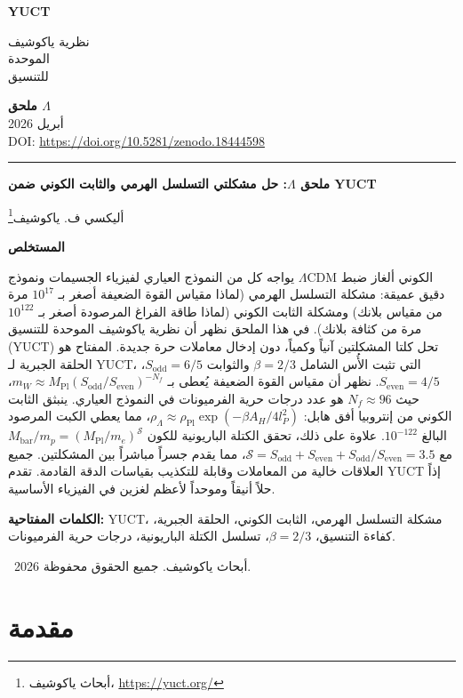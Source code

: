 \documentclass[12pt,a4paper]{article}
\newcommand{\makeheader}{%
	\noindent
	\begin{minipage}{0.17\textwidth}
		\raggedright
		{\sffamily\bfseries\color{skyblue}\fontsize{46}{46}\selectfont YUCT}%
	\end{minipage}%
	\hspace{30pt}
	\begin{minipage}{0.32\textwidth}
		\raggedright
		{\sffamily\fontsize{11}{13}\selectfont نظرية ياكوشيف\\ الموحدة\\ للتنسيق}%
	\end{minipage}%
	\hfill
	\begin{minipage}{0.38\textwidth}
		\raggedleft
		{\sffamily\bfseries ملحق \(\Lambda\)}\\
		{\sffamily أبريل 2026}\\
		{\sffamily\footnotesize \scriptsize DOI: \url{https://doi.org/10.5281/zenodo.18444598}}%
	\end{minipage}
	\par\vspace{5pt}
	\noindent\textcolor{gold}{\rule{\textwidth}{1.6pt}}
	\par\vspace{0pt}
}
\begin{document}
	\thispagestyle{firstpage}
	\makeheader
	
	\vspace{0cm}
	{\LARGE\bfseries ملحق \(\Lambda\): حل مشكلتي التسلسل الهرمي والثابت الكوني ضمن YUCT \par}
	\vspace{0.2cm}
	
	{\large أليكسي ف. ياكوشيف\footnote{أبحاث ياكوشيف، \url{https://yuct.org/}}} \\
	\vspace{0.0cm}
	
	{\color{darkblue}\textbf{\LARGE المستخلص}} \par
	{\large
		\noindent
		يواجه كل من النموذج العياري لفيزياء الجسيمات ونموذج \(\Lambda\)CDM الكوني ألغاز ضبط دقيق عميقة: مشكلة التسلسل الهرمي (لماذا مقياس القوة الضعيفة أصغر بـ \(10^{17}\) مرة من مقياس بلانك) ومشكلة الثابت الكوني (لماذا طاقة الفراغ المرصودة أصغر بـ \(10^{122}\) مرة من كثافة بلانك). في هذا الملحق نظهر أن نظرية ياكوشيف الموحدة للتنسيق (YUCT) تحل كلتا المشكلتين آنياً وكمياً، دون إدخال معاملات حرة جديدة. المفتاح هو الحلقة الجبرية لـ YUCT، التي تثبت الأُس الشامل \(\beta = 2/3\) والثوابت \(S_{\mathrm{odd}} = 6/5\)، \(S_{\mathrm{even}} = 4/5\). نظهر أن مقياس القوة الضعيفة يُعطى بـ \(m_W \approx M_{\mathrm{Pl}} (S_{\mathrm{odd}}/S_{\mathrm{even}})^{-N_f}\)، حيث \(N_f \approx 96\) هو عدد درجات حرية الفرميونات في النموذج العياري. ينبثق الثابت الكوني من إنتروبيا أفق هابل: \(\rho_\Lambda \approx \rho_{\mathrm{Pl}} \exp(-\beta A_H / 4l_P^2)\)، مما يعطي الكبت المرصود البالغ \(10^{-122}\). علاوة على ذلك، تحقق الكتلة الباريونية للكون \(M_{\mathrm{bar}}/m_p = (M_{\mathrm{Pl}}/m_e)^{\mathcal{S}}\) مع \(\mathcal{S} = S_{\mathrm{odd}} + S_{\mathrm{even}} + S_{\mathrm{odd}}/S_{\mathrm{even}} = 3.5\)، مما يقدم جسراً مباشراً بين المشكلتين. جميع العلاقات خالية من المعاملات وقابلة للتكذيب بقياسات الدقة القادمة. تقدم YUCT إذاً حلاً أنيقاً وموحداً لأعظم لغزين في الفيزياء الأساسية.
	}
	
	\vspace{0.1cm}
	\noindent
	{\color{darkblue}\textbf{الكلمات المفتاحية:}} YUCT، مشكلة التسلسل الهرمي، الثابت الكوني، الحلقة الجبرية، كفاءة التنسيق، \(\beta = 2/3\)، تسلسل الكتلة الباريونية، درجات حرية الفرميونات.
	
	\vspace{0.5cm}
	\noindent
	\textcopyright\ 2026 أبحاث ياكوشيف. جميع الحقوق محفوظة.
	
	\tableofcontents
	\newpage
	
	\section{مقدمة}
	
\end{document}
